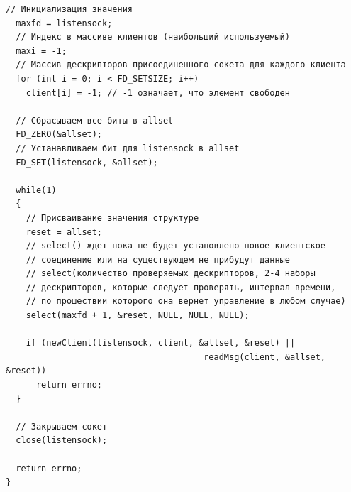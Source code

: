 \documentclass[a4paper,14pt]{extreport} %
\begin{document}
\begin{lstlisting}[caption=Код сервера]
  // Инициализация значения
  maxfd = listensock;
  // Индекс в массиве клиентов (наибольший используемый)
  maxi = -1;
  // Массив дескрипторов присоединенного сокета для каждого клиента
  for (int i = 0; i < FD_SETSIZE; i++)
    client[i] = -1; // -1 означает, что элемент свободен

  // Сбрасываем все биты в allset
  FD_ZERO(&allset);
  // Устанавливаем бит для listensock в allset
  FD_SET(listensock, &allset);

  while(1)
  {
    // Присваивание значения структуре
    reset = allset;
    // select() ждет пока не будет установлено новое клиентское 
    // соединение или на существующем не прибудут данные
    // select(количество проверяемых дескрипторов, 2-4 наборы 
    // дескрипторов, которые следует проверять, интервал времени, 
    // по прошествии которого она вернет управление в любом случае)
    select(maxfd + 1, &reset, NULL, NULL, NULL);

    if (newClient(listensock, client, &allset, &reset) ||
                                       readMsg(client, &allset, &reset))
      return errno;
  }

  // Закрываем сокет
  close(listensock);

  return errno;
}
\end{lstlisting}
\end{document}
